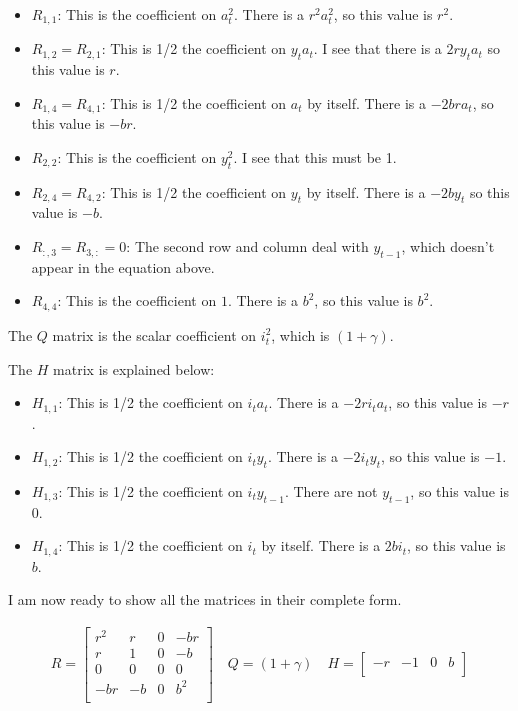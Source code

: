 \begin{homeworkProblem}[Problem 5.3]
{\begin{enumerate}[a.]
        \begin{itemize}
          \item $R_{1, 1}$: This is the coefficient on $a_t^2$. There is a $r^2a_t^2$, so this value is $r^2$.
          \item $R_{1, 2} = R_{2,1}$: This is 1/2 the coefficient on $y_t a_t$. I see that there is a $2r y_t a_t$ so this value is $r$.
          \item $R_{1, 4} = R_{4, 1}$: This is 1/2 the coefficient on $a_t$ by itself. There is a $-2br a_t$, so this value is $-br$.
          \item $R_{2, 2}$: This is the coefficient on $y_t^2$. I see that this must be 1.
          \item $R_{2, 4} = R_{4,2}$: This is 1/2 the coefficient on $y_t$ by itself. There is a $-2b y_t$ so this value is $-b$.
          \item $R_{:, 3} = R_{3, :} = 0$: The second row and column deal with $y_{t-1}$, which doesn't appear in the equation above.
          \item $R_{4, 4}$: This is the coefficient on $1$. There is a $b^2$, so this value is $b^2$.
        \end{itemize}

        The $Q$ matrix is the scalar coefficient on $i_t^2$, which is $(1 + \gamma)$.

        The $H$ matrix is explained below:

        \begin{itemize}
          \item $H_{1, 1}$: This is 1/2 the coefficient on $i_t a_t$. There is a  $-2 r i_t a_t$, so this value is $-r$.
          \item $H_{1, 2}$: This is 1/2 the coefficient on $i_t y_t$. There is a  $-2 i_t y_t$, so this value is $-1$.
          \item $H_{1, 3}$: This is 1/2 the coefficient on $i_t y_{t-1}$. There are not $y_{t-1}$, so this value is $0$.
          \item $H_{1, 4}$: This is 1/2 the coefficient on $i_t$ by itself. There is a  $2 b i_t$, so this value is $b$.
        \end{itemize}

        I am now ready to show all the matrices in their complete form.

        \begin{align} \label{eq:p3e6}
          R =
          \begin{bmatrix}
            r^2 & r & 0 & -br \\
            r & 1 & 0 & -b \\
            0 & 0 & 0 & 0 \\
            -br & -b & 0 & b^2 \\
          \end{bmatrix}
          \quad
          Q = (1 + \gamma)
          \quad
          H = \begin{bmatrix} -r & -1 & 0 & b \\ \end{bmatrix}
        \end{align}


\end{enumerate}}
\end{homeworkProblem}

